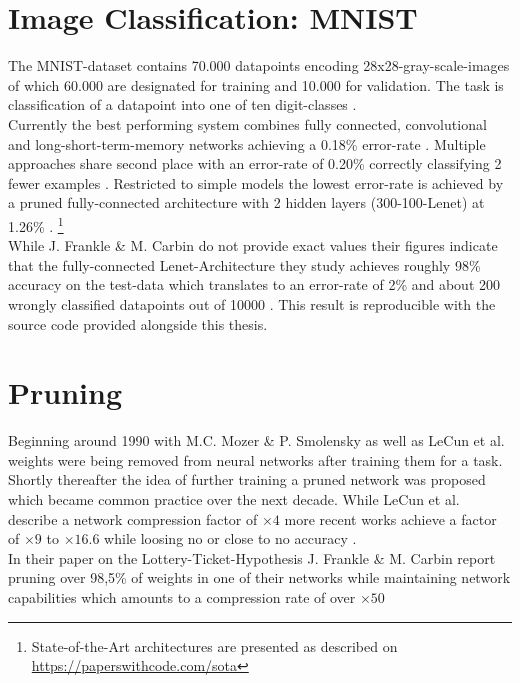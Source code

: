 \section{Image Classification: MNIST}
The MNIST-dataset contains 70.000 datapoints encoding 28x28-gray-scale-images of which 60.000 are designated for training and 10.000 for validation. The task is classification of a datapoint into one of ten digit-classes \cite{MNIST}.\\
Currently the best performing system combines fully connected, convolutional  and long-short-term-memory networks achieving a 0.18\% error-rate \cite{RMDL}. Multiple approaches share second place with an error-rate of 0.20\% correctly classifying 2 fewer examples \cite{Multi-Column} \cite{APAC} \cite{Batch-Normalized} \cite{ReNet} \cite{Keep-It-Simple}. Restricted to simple models the lowest error-rate is achieved by a pruned fully-connected architecture with 2 hidden layers (300-100-Lenet) at 1.26\% \cite{Sparse-From-Sratch}.
\footnote
	{State-of-the-Art architectures are presented as described on \href{https://paperswithcode.com/sota}{https://paperswithcode.com/sota}}\\
While J. Frankle \& M. Carbin do not provide exact values their figures indicate that the fully-connected Lenet-Architecture they study achieves roughly 98\% accuracy on the test-data which translates to an error-rate of 2\% and about 200 wrongly classified datapoints out of 10000 \cite{Frankle2018}. This result is reproducible with the source code provided alongside this thesis.

\section{Pruning}
Beginning around 1990 with M.C. Mozer \& P. Smolensky \cite{Skeletonization} as well as LeCun et al. \cite{Optimal-Brain-Damage} weights were being removed from neural networks after training them for a task. Shortly thereafter the idea of further training a pruned network was proposed \cite{Optimal-Brain-Surgeon} which became common practice over the next decade. While LeCun et al. describe a network compression factor of $\times4$ more recent works achieve a factor of $\times9$ to $\times16.6$ while loosing no or close to no accuracy \cite{Learning_Weights_And_Connections} \cite{ThiNet}.\\
In their paper on the Lottery-Ticket-Hypothesis J. Frankle \& M. Carbin report pruning over 98,5\% of weights in one of their networks while maintaining network capabilities which amounts to a compression rate of over $\times50$


